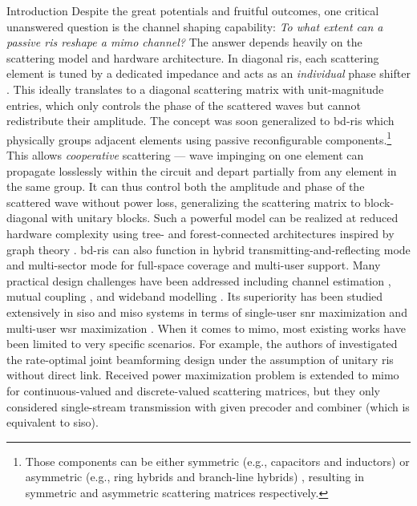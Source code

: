 \documentclass[journal]{IEEEtran}
\begin{document}
\begin{section}{Introduction}
	Despite the great potentials and fruitful outcomes, one critical unanswered question is the {channel shaping} capability: \emph{To what extent can a passive \gls{ris} reshape a \gls{mimo} channel?}
	The answer depends heavily on the scattering model and hardware architecture.
	In diagonal \gls{ris}, each scattering element is tuned by a dedicated impedance and acts as an \emph{individual} phase shifter \cite{Wu2020}.
	This ideally translates to a diagonal scattering matrix with unit-magnitude entries, which only controls the phase of the scattered waves but cannot redistribute their amplitude.
	The concept was soon generalized to \gls{bd}-\gls{ris} \cite{Shen2020a} which physically groups adjacent elements using passive reconfigurable components.\footnote{Those components can be either symmetric (e.g., capacitors and inductors) or asymmetric (e.g., ring hybrids and branch-line hybrids) \cite{Ahn2006}, resulting in symmetric and asymmetric scattering matrices respectively.}
	This allows \emph{cooperative} scattering --- wave impinging on one element can propagate losslessly within the circuit and depart partially from any element in the same group.
	It can thus control both the amplitude and phase of the scattered wave without power loss, generalizing the scattering matrix to block-diagonal with unitary blocks.
	Such a powerful model can be realized at reduced hardware complexity using tree- and forest-connected architectures inspired by graph theory \cite{Nerini2024}.
	\gls{bd}-\gls{ris} can also function in hybrid transmitting-and-reflecting mode \cite{Li2023b} and multi-sector mode \cite{Li2023c} for full-space coverage and multi-user support.
	Many practical design challenges have been addressed including channel estimation \cite{Li2024}, mutual coupling \cite{Li2023f}, and wideband modelling \cite{Li2024a}.
	Its superiority has been studied extensively in \gls{siso} and \gls{miso} systems in terms of single-user \gls{snr} maximization \cite{Shen2020a,Nerini2023,Nerini2024,Santamaria2023} and multi-user \gls{wsr} maximization \cite{Fang2023,Zhou2023,Li2023c,Soleymani2024}.
	When it comes to \gls{mimo}, most existing works have been limited to very specific scenarios.
	For example, the authors of \cite{Bartoli2023} investigated the rate-optimal joint beamforming design under the assumption of unitary \gls{ris} without direct link.
	Received power maximization problem is extended to \gls{mimo} for continuous-valued \cite{Nerini2023} and discrete-valued \cite{Nerini2023b} scattering matrices, but they only considered single-stream transmission with given precoder and combiner (which is equivalent to \gls{siso}).

\end{section}
\end{document}
